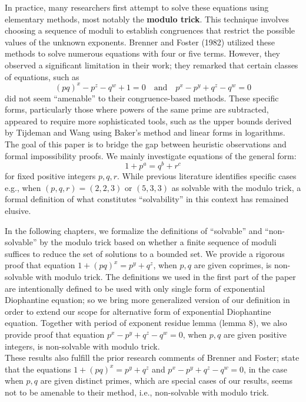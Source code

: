 \documentclass[12pt]{article}
\begin{document}
\hspace*{0.5cm} In practice, many researchers first attempt to solve these equations using elementary methods, most notably the \textbf{modulo trick}. This technique involves choosing a sequence of moduli to establish congruences that restrict the possible values of the unknown exponents. Brenner and Foster (1982) utilized these methods to solve numerous equations with four or five terms. However, they observed a significant limitation in their work; they remarked that certain classes of equations, such as 
$$(pq)^x - p^z - q^w + 1 = 0 \quad \text{and} \quad p^x - p^y + q^z - q^w = 0$$
did not seem ``amenable'' to their congruence-based methods. These specific forms, particularly those where powers of the same prime are subtracted, appeared to require more sophisticated tools, such as the upper bounds derived by Tijdeman and Wang \cite{wang} using Baker’s method and linear forms in logarithms.\\
\hspace*{0.5cm} The goal of this paper is to bridge the gap between heuristic observations and formal impossibility proofs. We mainly investigate equations of the general form:
\[1+p^a = q^b + r^c \]
for fixed positive integers $p, q, r$. While previous literature \cite{eDe} identifies specific cases e.g., when $(p,q,r) = (2,2,3)$ or $(5,3,3)$ as solvable with the modulo trick, a formal definition of what constitutes ``solvability'' in this context has remained elusive.

\hspace*{0.5cm} In the following chapters, we formalize the definitions of ``solvable'' and ``non-solvable'' by the modulo trick based on whether a finite sequence of moduli suffices to reduce the set of solutions to a bounded set. We provide a rigorous proof that equation $1+(pq)^x=p^y+q^z$, when $p,q$ are given coprimes, is non-solvable with modulo trick. The definitions we used in the first part of the paper are intentionally defined to be used with only single form of exponential Diophantine equation; so we bring more generalized version of our definition in order to extend our scope for alternative form of exponential Diophantine equation. Together with period of exponent residue lemma (lemma 8), we also provide proof that equation $p^x-p^y+q^z-q^w=0$, when $p,q$ are given positive integers, is non-solvable with modulo trick. \\
\hspace*{0.5cm}These results also fulfill the prior research comments of \cite{eDe} Brenner and Foster; state that the equations $1+(pq)^x=p^y+q^z$ and $p^x-p^y+q^z-q^w=0$, in the case when $p,q$ are given distinct primes, which are special cases of our results, seems not to be amenable to their method, i.e., non-solvable with modulo trick. 
\end{document}

